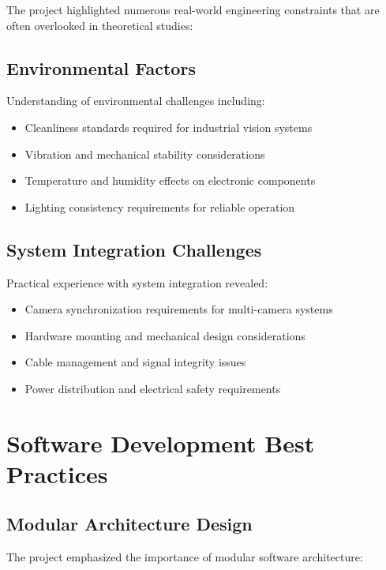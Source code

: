 \documentclass{book}
\begin{document}
\par\noindent The project highlighted numerous real-world engineering constraints that are often overlooked in theoretical studies:

\subsection{Environmental Factors}
\par\noindent Understanding of environmental challenges including:

\begin{itemize}
\item Cleanliness standards required for industrial vision systems
\item Vibration and mechanical stability considerations
\item Temperature and humidity effects on electronic components
\item Lighting consistency requirements for reliable operation
\end{itemize}

\subsection{System Integration Challenges}
\par\noindent Practical experience with system integration revealed:

\begin{itemize}
\item Camera synchronization requirements for multi-camera systems
\item Hardware mounting and mechanical design considerations
\item Cable management and signal integrity issues
\item Power distribution and electrical safety requirements
\end{itemize}

\section{Software Development Best Practices}

\subsection{Modular Architecture Design}
\par\noindent The project emphasized the importance of modular software architecture:
\end{document}
